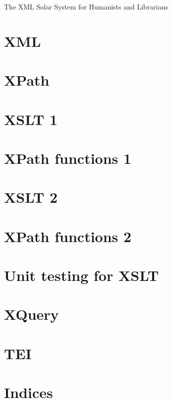 \documentclass[open=any, index=totoc, paper=167mm:239mm]{scrbook}
\begin{document}
  \frontmatter  
    \thispagestyle{empty}
    \vspace*{\fill}
    \begin{center}The XML Solar System for Humanists and Librarians\end{center}
    \vspace*{\fill}

    \tableofcontents

  \mainmatter
    \part{XML}
    

    \part{XPath}

    \part{XSLT 1}

    \part{XPath functions 1}

    \part{XSLT 2}

    \part{XPath functions 2}

    \part{Unit testing for XSLT}

    \part{XQuery}

    \part{TEI}

    \part{Indices}
    \printindex*
\end{document}
